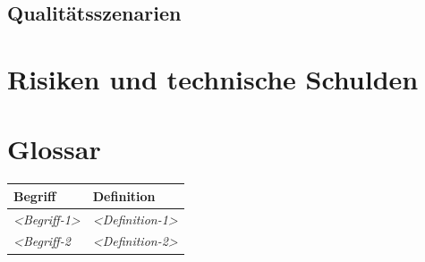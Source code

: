 \documentclass[
]{article}
\begin{document}
\hypertarget{_qualit_tsszenarien}{%
\subsection{Qualitätsszenarien}\label{_qualit_tsszenarien}}

\hypertarget{section-technical-risks}{%
\section{Risiken und technische
Schulden}\label{section-technical-risks}}

\hypertarget{section-glossary}{%
\section{Glossar}\label{section-glossary}}

\begin{longtable}[]{@{}ll@{}}
\toprule
\begin{minipage}[b]{0.31\columnwidth}\raggedright
Begriff\strut
\end{minipage} & \begin{minipage}[b]{0.63\columnwidth}\raggedright
Definition\strut
\end{minipage}\tabularnewline
\midrule
\endhead
\begin{minipage}[t]{0.31\columnwidth}\raggedright
\emph{\textless Begriff-1\textgreater{}}\strut
\end{minipage} & \begin{minipage}[t]{0.63\columnwidth}\raggedright
\emph{\textless Definition-1\textgreater{}}\strut
\end{minipage}\tabularnewline
\begin{minipage}[t]{0.31\columnwidth}\raggedright
\emph{\textless Begriff-2}\strut
\end{minipage} & \begin{minipage}[t]{0.63\columnwidth}\raggedright
\emph{\textless Definition-2\textgreater{}}\strut
\end{minipage}\tabularnewline
\bottomrule
\end{longtable}
\end{document}
